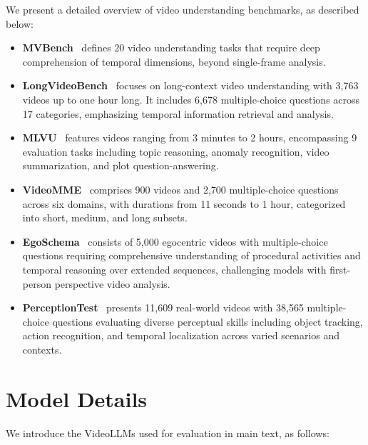 We present a detailed overview of video understanding benchmarks, as described below:
\begin{itemize}
    \item \textbf{MVBench}~\cite{li2024mvbench} defines 20 video understanding tasks that require deep comprehension of temporal dimensions, beyond single-frame analysis.
    
    \item \textbf{LongVideoBench}~\cite{wu2024longvideobench} focuses on long-context video understanding with 3,763 videos up to one hour long. It includes 6,678 multiple-choice questions across 17 categories, emphasizing temporal information retrieval and analysis.
    
    \item \textbf{MLVU}~\cite{zhou2024mlvu} features videos ranging from 3 minutes to 2 hours, encompassing 9 evaluation tasks including topic reasoning, anomaly recognition, video summarization, and plot question-answering.
    
    \item \textbf{VideoMME}~\cite{fu2024videomme} comprises 900 videos and 2,700 multiple-choice questions across six domains, with durations from 11 seconds to 1 hour, categorized into short, medium, and long subsets.
    
    \item \textbf{EgoSchema}~\cite{mangalam2023egoschema} consists of 5,000 egocentric videos with multiple-choice questions requiring comprehensive understanding of procedural activities and temporal reasoning over extended sequences, challenging models with first-person perspective video analysis.
    
    \item \textbf{PerceptionTest}~\cite{patraucean2023perception} presents 11,609 real-world videos with 38,565 multiple-choice questions evaluating diverse perceptual skills including object tracking, action recognition, and temporal localization across varied scenarios and contexts.
    
\end{itemize}


\section{Model Details}
\label{sec:appendix/models}

We introduce the VideoLLMs used for evaluation in main text, as follows:

